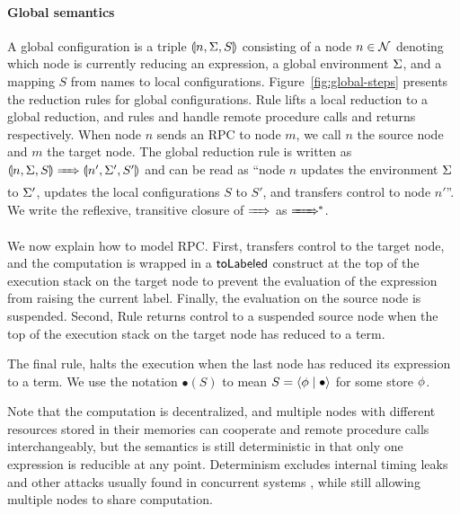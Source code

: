 \paragraph{Global semantics}
A global configuration is a triple $\llparenthesis n, \Sigma, S \rrparenthesis$ consisting of a node $n \in \mathcal{N}$ denoting which node is currently reducing an expression, a global environment $\Sigma$, and a mapping $S$ from names to local configurations. Figure~\ref{fig:global-steps} presents the reduction rules for global configurations. Rule  lifts a local reduction to a global reduction, and rules  and  handle remote procedure calls and returns respectively. When node $n$ sends an RPC to node $m$, we call $n$ the source node and $m$ the target node. The global reduction rule is written as $\gconfig{n}{\env}{S} \gstepsto \gconfig{n'}{\env'}{S'}$ and can be read as ``node $n$ updates the environment $\Sigma$ to $\Sigma'$, updates the local configurations $S$ to $S'$, and transfers control to node $n'$''. We write the reflexive, transitive closure of $\gstepsto$ as $\gstepstos$.

We now explain how to model RPC. First,  transfers control to the target node, and the computation is wrapped in a $\mathsf{toLabeled}$ construct at the top of the execution stack on the target node to prevent the evaluation of the expression from raising the current label. Finally, the evaluation on the source node is suspended. Second, Rule  returns control to a suspended source node when the top of the execution stack on the target node has reduced to a term.

The final rule,  halts the execution when the last node has reduced its expression to a term. We use the notation $\bullet(S)$ to mean $S = \langle \phi \mid \bullet \rangle$ for some store $\phi$.

Note that the computation is decentralized, and multiple nodes with different resources stored in their memories can cooperate and remote procedure calls interchangeably, but the semantics is still deterministic in that only one expression is reducible at any point. Determinism excludes internal timing leaks and other attacks usually found in concurrent systems \cite{Smith:1998:SIF:268946.268975, Muller:2012:TPS:2384616.2384621}, while still allowing multiple nodes to share computation.

